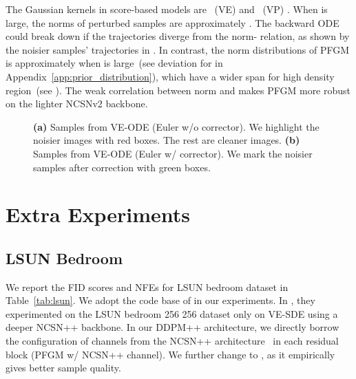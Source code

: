 The Gaussian kernels in score-based models are ~(VE) and ~(VP) \cite{Song2021ScoreBasedGM}. When  is large, the norms of perturbed samples are approximately . The backward ODE could break down if the trajectories diverge from the norm- relation, as shown by the noisier samples' trajectories in . In contrast, the norm distributions of PFGM is approximately  when  is large~(see deviation for  in Appendix~\ref{app:prior_distribution}), which have a wider span for high density region~(see ). The weak correlation between norm and  makes PFGM more robust on the lighter NCSNv2 backbone.


\begin{figure*}
    \centering
    \hspace{10pt}
    \caption{\textbf{(a)} Samples from VE-ODE (Euler w/o corrector). We highlight the noisier images with red boxes. The rest are cleaner images. \textbf{(b)} Samples from VE-ODE (Euler w/ corrector). We mark the noisier samples after correction with green boxes.}
\end{figure*}

\section{Extra Experiments}
\label{app:extra-exp}
\subsection{LSUN Bedroom }
\label{app:exp-lsun}
We report the FID scores and NFEs for LSUN bedroom dataset in Table~\ref{tab:lsun}. We adopt the code base of \cite{Song2021ScoreBasedGM} in our experiments. In \cite{Song2021ScoreBasedGM}, they experimented on the LSUN bedroom 256 256 dataset only on VE-SDE using a deeper NCSN++ backbone. In our DDPM++ architecture, we directly borrow the configuration of channels from the NCSN++ architecture~\cite{Song2021ScoreBasedGM} in each residual block (PFGM w/ NCSN++ channel). We further change  to , as it empirically gives better sample quality.

